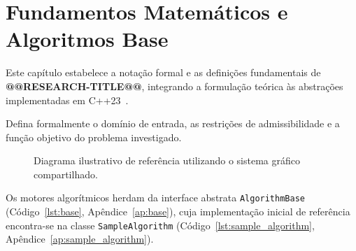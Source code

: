 \chapter{Fundamentos Matemáticos e Algoritmos Base}\label{sec:fundamentos}

Este capítulo estabelece a notação formal e as definições fundamentais de \textbf{@@RESEARCH-TITLE@@}, integrando a formulação teórica às abstrações implementadas em C++23~\cite{cormen2022introduction, korte2018combinatorial}.

\begin{definicao}
Defina formalmente o domínio de entrada, as restrições de admissibilidade e a função objetivo do problema investigado.
\end{definicao}

\begin{figure}[!ht]
\centering

\caption{Diagrama ilustrativo de referência utilizando o sistema gráfico compartilhado.}
\label{fig:exemplo_base}
\end{figure}

Os motores algorítmicos herdam da interface abstrata \lstinline{AlgorithmBase} (Código~\ref{lst:base}, Apêndice~\ref{ap:base}), cuja implementação inicial de referência encontra-se na classe \lstinline{SampleAlgorithm} (Código~\ref{lst:sample_algorithm}, Apêndice~\ref{ap:sample_algorithm}).
